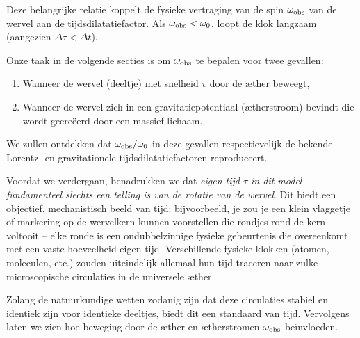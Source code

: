 Deze belangrijke relatie koppelt de fysieke vertraging van de spin $\omega_{\rm obs}$ van de wervel aan de tijdsdilatatiefactor. Als $\omega_{\rm obs} < \omega_0$, loopt de klok langzaam (aangezien $\Delta \tau < \Delta t$).

Onze taak in de volgende secties is om $\omega_{\rm obs}$ te bepalen voor twee gevallen:
\begin{enumerate}
    \item Wanneer de wervel (deeltje) met snelheid $v$ door de æther beweegt,
    \item Wanneer de wervel zich in een gravitatiepotentiaal (ætherstroom) bevindt die wordt gecreëerd door een massief lichaam.
\end{enumerate}
We zullen ontdekken dat $\omega_{\rm obs}/\omega_0$ in deze gevallen respectievelijk de bekende Lorentz- en gravitationele tijdsdilatatiefactoren reproduceert.

Voordat we verdergaan, benadrukken we dat \emph{eigen tijd $\tau$ in dit model fundamenteel slechts een telling is van de rotatie van de wervel}. Dit biedt een objectief, mechanistisch beeld van tijd: bijvoorbeeld, je zou je een klein vlaggetje of markering op de wervelkern kunnen voorstellen die rondjes rond de kern voltooit – elke ronde is een ondubbelzinnige fysieke gebeurtenis die overeenkomt met een vaste hoeveelheid eigen tijd. Verschillende fysieke klokken (atomen, moleculen, etc.) zouden uiteindelijk allemaal hun tijd traceren naar zulke microscopische circulaties in de universele æther.

Zolang de natuurkundige wetten zodanig zijn dat deze circulaties stabiel en identiek zijn voor identieke deeltjes, biedt dit een standaard van tijd. Vervolgens laten we zien hoe beweging door de æther en ætherstromen $\omega_{\rm obs}$ beïnvloeden.